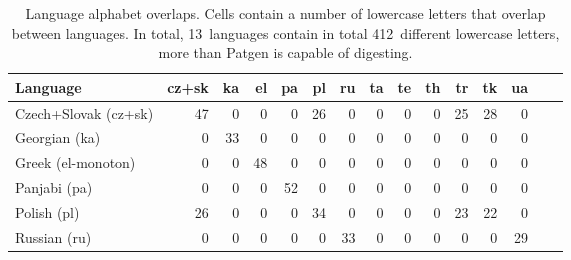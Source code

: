 \documentclass{csbulletin}
\let\program=\textrm %
\newcommand{\Patgen}{\program{Patgen}\xspace}
\begin{document}
\begin{table}[b]
\centering
{}
\caption{Language alphabet overlaps.
Cells contain a number of lowercase letters that overlap between languages.
In total, 13~languages contain in total 412~different lowercase letters, more than \Patgen is capable of digesting.}
\label{tab:characters}
\smallskip 
\begin{tabular}{lrrrrrrrrrrrrrr}%
\toprule
Language & cz+sk & ka %
& el & pa & pl & ru %
& ta & te & th & tr & tk & ua 
\\ \midrule
Czech+Slovak (cz+sk) %
  & 47%
  & 0%
  & 0%
  & 0%
  & 26%
  & 0%
  & 0%
  & 0%
  & 0%
  & 25%
  & 28%
  & 0%
  \\
Georgian (ka)  %
  & 0%
  & 33%
  & 0%
  & 0%
  & 0%
  & 0%
  & 0%
  & 0%
  & 0%
  & 0%
  & 0%
  & 0%
  \\ 
Greek (el-monoton) %
  & 0%
  & 0%
  & 48%
  & 0%
  & 0%
  & 0%
  & 0%
  & 0%
  & 0%
  & 0%
  & 0%
  & 0%
  \\
Panjabi (pa) %
  & 0%
  & 0%
  & 0%
  & 52%
  & 0%
  & 0%
  & 0%
  & 0%
  & 0%
  & 0%
  & 0%
  & 0%
  \\
Polish (pl) %
  & 26%
  & 0%
  & 0%
  & 0%
  & 34%
  & 0%
  & 0%
  & 0%
  & 0%
  & 23%
  & 22%
  & 0%
  \\
Russian (ru) %
  & 0%
  & 0%
  & 0%
  & 0%
  & 0%
  & 33%
  & 0%
  & 0%
  & 0%
  & 0%
  & 0%
  & 29%
  \\

\end{tabular}
\end{table}
\end{document}
